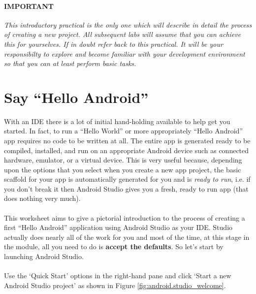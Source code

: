 \documentclass[12pt, a4paper, twoside]{book}
\begin{document}
\paragraph{IMPORTANT} \emph{This introductory practical is the only one which will describe in detail the process of creating a new project. All subsequent labs will assume that you can achieve this for yourselves. If in doubt refer back to this practical. It will be your responsibilty to explore and become familiar with your development environment so that you can at least perform basic tasks.}

\section{Say ``Hello Android''}
\label{hello}
\paragraph{} With an IDE there is a lot of initial hand-holding available to help get you started. In fact, to run a ``Hello World'' or more appropriately ``Hello Android'' app requires no code to be written at all. The entire app is generated ready to be compiled, installed, and run on an appropriate Android device such as connected hardware, emulator, or a virtual device. This is very useful because, depending upon the options that you select when you create a new app project, the basic scaffold for your app is automatically generated for you and is \emph{ready to run}, i.e. if you don't break it then Android Studio gives you a fresh, ready to run app (that does nothing very much). 

\paragraph{} This worksheet aims to give a pictorial introduction to the process of creating a first ``Hello Android'' application using Android Studio as your IDE. Studio actually does nearly all of the work for you and most of the time, at this stage in the module, all you need to do is {\bf{accept the defaults}}. So let's start by launching Android Studio.

\paragraph{} Use the `Quick Start' options in the right-hand pane and click `Start a new Android Studio project' as shown in Figure \ref{fig:android.studio_welcome}.
\end{document}
